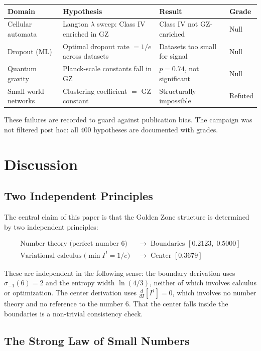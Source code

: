 \documentclass[11pt,a4paper]{article}
\begin{document}
\begin{center}
\begin{tabular}{llll}
\toprule
Domain & Hypothesis & Result & Grade \\
\midrule
Cellular automata & Langton $\lambda$ sweep: Class IV enriched in GZ & Class IV not GZ-enriched & Null \\
Dropout (ML) & Optimal dropout rate $= 1/e$ across datasets & Datasets too small for signal & Null \\
Quantum gravity & Planck-scale constants fall in GZ & $p = 0.74$, not significant & Null \\
Small-world networks & Clustering coefficient $=$ GZ constant & Structurally impossible & Refuted \\
\bottomrule
\end{tabular}
\end{center}

These failures are recorded to guard against publication bias. The campaign was not filtered post hoc: all 400 hypotheses are documented with grades.

\section{Discussion}

\subsection{Two Independent Principles}

The central claim of this paper is that the Golden Zone structure is determined by two independent principles:

\begin{align*}
\text{Number theory (perfect number 6)} &\;\longrightarrow\; \text{Boundaries } [0.2123,\; 0.5000] \\
\text{Variational calculus (}\min I^I = 1/e\text{)} &\;\longrightarrow\; \text{Center } [0.3679]
\end{align*}

These are independent in the following sense: the boundary derivation uses $\sigma_{-1}(6) = 2$ and the entropy width $\ln(4/3)$, neither of which involves calculus or optimization. The center derivation uses $\frac{d}{dI}[I^I] = 0$, which involves no number theory and no reference to the number 6. That the center falls inside the boundaries is a non-trivial consistency check.

\subsection{The Strong Law of Small Numbers}
\end{document}
